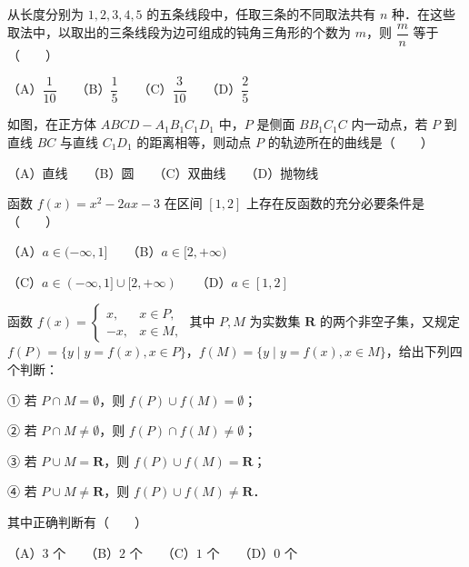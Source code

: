 \begin{question}
从长度分别为 $1, 2, 3, 4, 5$ 的五条线段中，任取三条的不同取法共有 $n$ 种．在这些取法中，以取出的三条线段为边可组成的钝角三角形的个数为 $m$，则 $\dfrac{m}{n}$ 等于\mbox{（　　）}

（A）$\dfrac{1}{10}$　　（B）$\dfrac{1}{5}$　　（C）$\dfrac{3}{10}$　　（D）$\dfrac{2}{5}$

\Needspace{0.4\textheight}
\end{question}
\begin{question}
如图，在正方体 $ABCD-A_1B_1C_1D_1$ 中，$P$ 是侧面 $BB_1C_1C$ 内一动点，若 $P$ 到直线 $BC$ 与直线 $C_1D_1$ 的距离相等，则动点 $P$ 的轨迹所在的曲线是\mbox{（　　）}
\nopagebreak[4]
\begin{center}\end{center}
\nopagebreak[4]
（A）直线　　（B）圆　　（C）双曲线　　（D）抛物线

\end{question}
\begin{question}
函数 $f(x)=x^2-2ax-3$ 在区间 $[1, 2]$ 上存在反函数的充分必要条件是\mbox{（　　）}

（A）$a\in(-\infty, 1]$　　（B）$a\in[2, +\infty)$

（C）$a\in(-\infty, 1]\cup[2, +\infty)$　　（D）$a\in[1, 2]$

\end{question}
\begin{question}
函数 $f(x)=\begin{cases} x, & x\in P, \\ -x, & x\in M, \end{cases}$ 其中 $P, M$ 为实数集 $\mathbf{R}$ 的两个非空子集，又规定 $f(P)=\{y\mid y=f(x), x\in P\}$，$f(M)=\{y\mid y=f(x), x\in M\}$，给出下列四个判断：

① 若 $P\cap M=\emptyset$，则 $f(P)\cup f(M)=\emptyset$；

② 若 $P\cap M\neq\emptyset$，则 $f(P)\cap f(M)\neq\emptyset$；

③ 若 $P\cup M=\mathbf{R}$，则 $f(P)\cup f(M)=\mathbf{R}$；

④ 若 $P\cup M\neq\mathbf{R}$，则 $f(P)\cup f(M)\neq\mathbf{R}$．

其中正确判断有\mbox{（　　）}

（A）$3$ 个　　（B）$2$ 个　　（C）$1$ 个　　（D）$0$ 个

\end{question}

